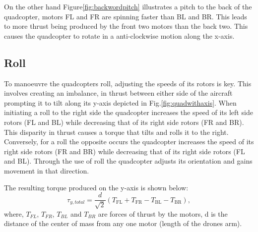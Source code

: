 \documentclass{report}
\begin{document}
On the other hand Figure\ref{fig:backwordpitch} illustrates a pitch to the back
of the quadcopter, motors FL and FR are spinning faster than BL and BR. This
leads to more thrust being produced by the front two motors than the back two.
This causes the quadcopter to rotate in a anti-clockwise motion along the
x-axis.

\subsection{Roll}
To manoeuvre the quadcopters roll, adjusting the speeds of its rotors is key.
This involves creating an imbalance, in thrust between either side of the
aircraft prompting it to tilt along its  y-axis depicted in
Fig.\ref{fig:quadwithaxis}. When initiating a roll to the right side the
quadcopter increases the speed of its left side rotors (FL and BL) while
decreasing that of its right side rotors (FR and BR). This disparity in thrust
causes a torque that tilts and rolls it to the right. Conversely, for a roll the
opposite occurs the quadcopter increases the speed of its right side rotors (FR
and BR) while decreasing that of its right side rotors (FL and BL). Through the
use of roll the quadcopter adjusts its orientation and gains movement in that
direction. 

The resulting torque produced on the y-axis is shown below:
\begin{equation}
  \tau_{y, total} = \frac{d}{\sqrt{2}} (T_{\text{FL}} + T_{\text{FR}} - T_{\text{BL}} - T_{\text{BR}}),
  \label{torque_y}
\end{equation}
where, \(T_{FL}\),  \(T_{FR}\), \(T_{BL}\) and \(T_{BR}\) are forces of thrust
by the motors, d is the distance of the center of mass from any one motor
(length of the drones arm).
\end{document}
